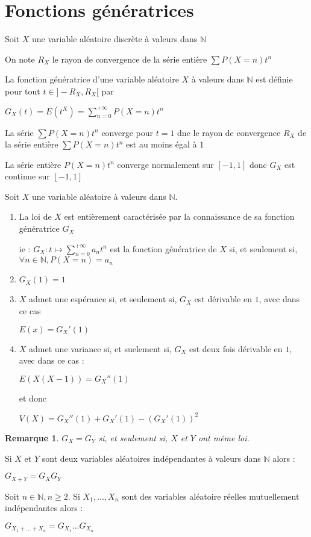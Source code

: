 \documentclass[a4paper,12pt]{book}
\newcommand{\Def}[2]{\begin{tcolorbox}[sharp corners, colback=white,colframe=blue!90!black!75, title=Définition : #1]#2\end{tcolorbox}}
\newcommand{\Thr}[2]{\begin{tcolorbox}[sharp corners, colback=white,colframe=red!90!black!75, title=Théorème : #1]#2\end{tcolorbox}}
\newcommand{\Prop}[2]{\begin{tcolorbox}[sharp corners, colback=white,colframe=red!90!black!75, title=Proposition : #1]#2\end{tcolorbox}}
\newtheorem{Rem}{Remarque}[section]
\def\N{\mathbb{N}}
\begin{document}
\section{Fonctions génératrices}
Soit $X$ une variable aléatoire discrète à valeurs dans $\N$
\Def{}{On note $R_X$ le rayon de convergence de la série entière $\sum P(X=n)t^n$
\par La fonction génératrice d'une variable aléatoire $X$ à valeurs dans $\N$ est définie pour tout $t\in]-R_X,R_X[$ par
\par\begin{center}$G_X(t)=E(t^X)=\sum\limits_{n=0}^{+\infty}P(X=n)t^n$\end{center}}
\Prop{}{La série $\sum P(X=n)t^n$ converge pour $t=1$ dnc le rayon de convergence $R_X$ de la série entière $\sum P(X=n)t^n$ est au moins égal à $1$}
\Prop{}{La série entière $P(X=n)t^n$ converge normalement sur $[-1,1]$ donc $G_X$ est continue sur $[-1,1]$}
\Thr{}{Soit $X$ une variable aléatoire à valeurs dans $\N$.\begin{enumerate}
\item La loi de $X$ est entièrement caractérisée par la connaissance de sa fonction génératrice $G_X$
\par ie : $G_X:t\mapsto \sum\limits_{n=0}^{+\infty}a_nt^n$ est la fonction génératrice de $X$ si, et seulement si, $\forall n\in \N, P(X=n)=a_n$
\item $G_X(1)=1$
\item $X$ admet une espérance si, et seulement si, $G_X$ est dérivable en $1$, avec dans ce cas \par\begin{center}$E(x) =G_X'(1)$\end{center}
\item $X$ admet une variance si, et suelement si, $G_X$ est deux fois dérivable en $1$, avec dans ce cas :\par\begin{center}$E(X(X-1))=G_X''(1)$\end{center}
\par et donc \par\begin{center}$V(X)=G_X''(1)+G_X'(1)-(G_X'(1))^2$\end{center}
\end{enumerate}}
\begin{Rem}
$G_X=G_Y$ si, et seulement si, $X$ et $Y$ ont même loi.
\end{Rem}
\Thr{}{Si $X$ et $Y$ sont deux variables aléatoires indépendantes à valeurs dans $\N$ alors :\par\begin{center}$G_{X+Y}=G_XG_Y$\end{center}
\par Soit $n\in\N, n\geq 2$. Si $X_1,...,X_n$ sont des variables aléatoire réelles mutuellement indépendantes alors : \par\begin{center}$G_{X_1+...+X_n}=G_{X_1}...G_{X_n}$\end{center}}
\end{document}
